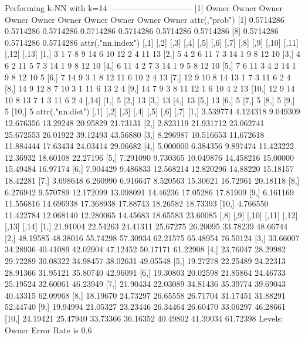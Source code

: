 \documentclass{article}
\begin{document}
\begin{Schunk}
\begin{Soutput}
Performing k-NN with k=14
 ------------------------------
 [1] Owner Owner Owner Owner Owner Owner Owner Owner Owner Owner
attr(,"prob")
 [1] 0.5714286 0.5714286 0.5714286 0.5714286 0.5714286 0.5714286 0.5714286
 [8] 0.5714286 0.5714286 0.5714286
attr(,"nn.index")
      [,1] [,2] [,3] [,4] [,5] [,6] [,7] [,8] [,9] [,10] [,11] [,12] [,13]
 [1,]    3    1    7    8    9   14    6   10   12     2     4    11    13
 [2,]    5    4    2    6   11    7    3   14    1     9     8    12    10
 [3,]    4    6    2   11    5    7    3   14    1     9     8    12    10
 [4,]    6   11    4    2    7    3   14    1    9     5     8    12    10
 [5,]    7    6   11    3    4    2   14    1    9     8    12    10     5
 [6,]    7   14    9    3    1    8   12   11    6    10     2     4    13
 [7,]   12    9   10    8   14   13    1    7    3    11     6     2     4
 [8,]   14    9   12    8    7   10    3    1   11     6    13     2     4
 [9,]   14    7    9    3    8   11   12    1    6    10     4     2    13
[10,]   12    9   14   10    8   13    7    1    3    11     6     2     4
      [,14]
 [1,]     5
 [2,]    13
 [3,]    13
 [4,]    13
 [5,]    13
 [6,]     5
 [7,]     5
 [8,]     5
 [9,]     5
[10,]     5
attr(,"nn.dist")
          [,1]      [,2]      [,3]      [,4]     [,5]     [,6]     [,7]
 [1,] 3.539774  4.124318  9.049309 12.676356 13.29248 20.95829 21.73131
 [2,] 2.823119 21.931712 23.062741 25.672553 26.01922 39.12493 43.56880
 [3,] 8.296987 10.516653 11.672618 11.884444 17.63434 24.03414 29.06682
 [4,] 5.000000  6.384356  9.897474 11.423222 12.36932 18.60108 22.27196
 [5,] 7.291090  9.730365 10.049876 14.458216 15.00000 15.49484 16.97174
 [6,] 7.904429  9.486833 12.568214 12.820296 14.88220 15.18157 18.42281
 [7,] 3.698648  6.260990  6.916647  8.520563 15.30621 16.72961 20.18118
 [8,] 6.276942  9.570789 12.172099 13.098091 14.46236 17.05286 17.81909
 [9,] 6.161169 11.556816 14.696938 17.368938 17.88743 18.26582 18.73393
[10,] 4.766550 11.422784 12.068140 12.280065 14.45683 18.65583 23.60085
          [,8]     [,9]    [,10]    [,11]    [,12]    [,13]    [,14]
 [1,] 21.91004 22.54263 24.41311 25.67275 26.20095 33.78239 48.66744
 [2,] 48.19585 48.38016 55.74298 57.30934 62.21575 65.48954 76.50124
 [3,] 33.66007 34.28936 40.41089 42.02904 47.12452 50.17171 61.22908
 [4,] 23.76047 28.29982 29.72289 30.08322 34.98457 38.02631 49.05548
 [5,] 19.27278 22.25489 24.22313 28.91366 31.95121 35.80740 42.96091
 [6,] 19.30803 20.02598 21.85864 24.46733 25.19524 32.60061 46.23949
 [7,] 21.90434 22.03089 34.81436 35.39774 39.69043 40.43315 62.09968
 [8,] 18.19670 24.73297 26.65558 26.71704 31.17451 31.88291 52.44740
 [9,] 19.94994 21.05327 23.23446 26.34464 26.60470 33.06297 46.28661
[10,] 24.19421 25.47940 33.73366 36.16352 40.49802 41.39034 61.72398
Levels: Owner
Error Rate is  0.6
\end{Soutput}
\end{Schunk}
\end{document}
